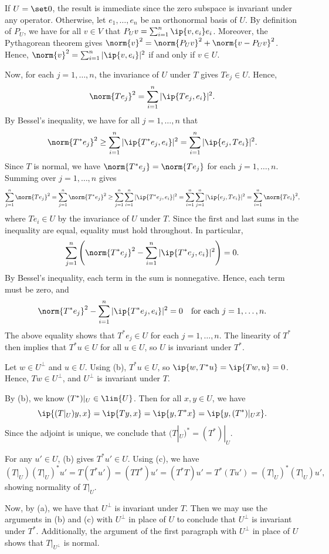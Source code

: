 \begin{solenum}
    \item [(b)] If $U = \set 0$, the result is immediate since the zero subspace is invariant under any operator.
    Otherwise, let $e_1, \ldots, e_n$ be an orthonormal basis of $U$.
    By definition of $P_U$, we have for all $v \in V$ that $P_U v = \sum_{i=1}^n \ip{v, e_i} e_i$.
    Moreover, the Pythagorean theorem gives $\norm{v}^2 = \norm{P_U v}^2 + \norm{v - P_U v}^2$.
    Hence, $\norm{v}^2 = \sum_{i=1}^n |\ip{v, e_i}|^2$ if and only if $v \in U$.
    
    Now, for each $j = 1, \ldots, n$, the invariance of $U$ under $T$ gives $T e_j \in U$.
    Hence,
    \[
        \norm{T e_j}^2 = \sum_{i=1}^n |\ip{T e_j, e_i}|^2.
    \]
    By Bessel's inequality, we have for all $j = 1, \ldots, n$ that
    \[
        \norm{T^\ast e_j}^2 \geq \sum_{i=1}^n |\ip{T^\ast e_j, e_i}|^2 = \sum_{i=1}^n |\ip{e_j, T e_i}|^2.
    \]
    Since $T$ is normal, we have $\norm{T^\ast e_j} = \norm{T e_j}$ for each $j = 1, \ldots, n$.
    Summing over $j = 1, \ldots, n$ gives
    \[
        \sum_{j=1}^n \norm{T e_j}^2 = \sum_{j=1}^n \norm{T^\ast e_j}^2 \geq \sum_{j=1}^n \sum_{i=1}^n |\ip{T^\ast e_j, e_i}|^2 = \sum_{i=1}^n \sum_{j=1}^n |\ip{e_j, T e_i}|^2 = \sum_{i=1}^n \norm{T e_i}^2,
    \]
    where $T e_i \in U$ by the invariance of $U$ under $T$.
    Since the first and last sums in the inequality are equal, equality must hold throughout.
    In particular,
    \[
        \sum_{j=1}^n \left(\norm{T^\ast e_j}^2 - \sum_{i=1}^n |\ip{T^\ast e_j, e_i}|^2\right) = 0.
    \]
    By Bessel's inequality, each term in the sum is nonnegative. Hence, each term must be zero, and
    \[
        \norm{T^\ast e_j}^2 - \sum_{i=1}^n |\ip{T^\ast e_j, e_i}|^2 = 0 \quad \text{for each } j = 1, \ldots, n.
    \]
    The above equality shows that $T^\ast e_j \in U$ for each $j = 1, \ldots, n$.
    The linearity of $T^\ast$ then implies that $T^\ast u \in U$ for all $u \in U$, so $U$ is invariant under $T^\ast$.
    \item [(a)] Let $w \in U^\perp$ and $u \in U$.
    Using (b), $T^\ast u \in U$, so $\ip{w, T^\ast u} = \ip{T w, u} = 0$.
    Hence, $T w \in U^\perp$, and $U^\perp$ is invariant under $T$.
    \item [(c)] By (b), we know $(T^\ast)|_U \in \lin{U}$.
    Then for all $x, y \in U$, we have
    \[
        \ip{(T|_U)y, x} = \ip{T y, x} = \ip{y, T^\ast x} = \ip{y, (T^\ast)|_U x}.
    \]
    Since the adjoint is unique, we conclude that $(T|_U)^\ast = (T^\ast)|_U$.
    \item [(d)] For any $u' \in U$, (b) gives $T^\ast u' \in U$.
    Using (c), we have
    \[
        (T|_U)(T|_U)^\ast u' = T(T^\ast u') = (TT^\ast) u' = (T^\ast T) u' = T^\ast(T u') = (T|_U)^\ast (T|_U) u',
    \]
    showing normality of $T|_U$.

    Now, by (a), we have that $U^\perp$ is invariant under $T$.
    Then we may use the arguments in (b) and (c) with $U^\perp$ in place of $U$ to conclude that $U^\perp$ is invariant under $T^\ast$.
    Additionally, the argument of the first paragraph with $U^\perp$ in place of $U$ shows that $T|_{U^\perp}$ is normal.
\end{solenum}

